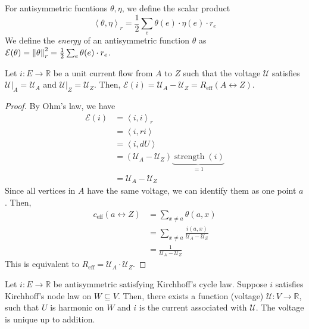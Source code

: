 \begin{defn}[Energy]
    For antisymmetric fucntions \(\theta, \eta\), we define the scalar product
    \[ \left\langle \theta, \eta \right\rangle_r = \frac{1}{2}\sum_{e}\theta(e)\cdot \eta(e)\cdot r_{e}\]
    We define the \emph{energy} of an antisymmetric function \(\theta\) as \(\mathcal{E}(\theta)=\norm{\theta}_{r}^2 = \frac{1}{2}\sum_{e}\theta(e)\cdot r_{e}\).
\end{defn}


\begin{lem}[]
    Let \(i: E \to \mathbb{R}\) be a unit current flow from \(A\) to \(Z\) such that the voltage \(\mathcal{U}\) satisfies \(\mathcal{U}\vert_A= \mathcal{U}_A\) and \(\mathcal{U}\vert_Z=\mathcal{U}_Z\). Then, \(\mathcal{E}(i)=\mathcal{U}_A- \mathcal{U}_Z= R_{\mathrm{eff}}(A \leftrightarrow Z)\). 
\end{lem}

\begin{proof}
    By Ohm's law, we have 
    \begin{align*}
      \mathcal{E}(i) &= \left\langle i,i \right\rangle_r \\
                     &= \left\langle i,ri \right\rangle \\
                     &= \left\langle i,dU \right\rangle \\
                     &= \left(\mathcal{U}_A- \mathcal{U}_Z\right) \underbrace{\operatorname{strength}(i)}_{=1} \\
                     &=\mathcal{U}_A-\mathcal{U}_Z
    \end{align*}
    Since all vertices in \(A\) have the same voltage, we can identify them as one point \(a\). Then,
    \begin{align*}
      c_{\mathrm{eff}}(a \leftrightarrow Z) &= \sum_{x\neq a} \theta(a,x) \\
                                            &= \sum_{x\neq a} \frac{i(a,x)}{\mathcal{U}_A-\mathcal{U}_Z} \\
                                            &= \frac{1}{\mathcal{U}_A-\mathcal{U}_Z}
    \end{align*}
    This is equivalent to \(R_{\mathrm{eff}}=\mathcal{U}_A \cdot \mathcal{U}_Z\).    
\end{proof}

\begin{lem}[]
    Let \(i: E \to \mathbb{R}\) be antisymmetric satisfying Kirchhoff's cycle law. Suppose \(i\) satisfies Kirchhoff's node law on \(W \subseteq V\). Then, there exists a function (voltage) \(\mathcal{U}: V \to \mathbb{R}\), such that \(U\) is harmonic on \(W\) and \(i\) is the current associated with \(\mathcal{U}\). The voltage is unique up to addition. 
\end{lem}

